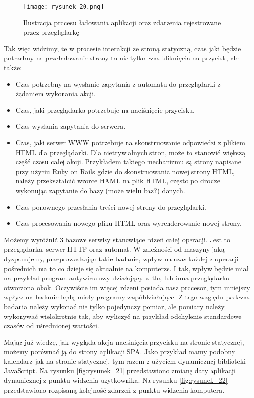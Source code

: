 \begin{figure}[!ht]
    \centering
    \texttt{[image: rysunek\_20.png]}
    \caption{Ilustracja procesu ładowania aplikacji oraz zdarzenia rejestrowane przez przeglądarkę}
    \label{fig:rysunek_20}
\end{figure}

Tak więc widzimy, że w procesie interakcji ze stroną statyczną, czas jaki będzie potrzebny na przeładowanie strony to nie tylko czas kliknięcia na przycisk, ale także:
\begin{itemize}
    \item Czas potrzebny na wysłanie zapytania z automatu do przeglądarki z żądaniem wykonania akcji.
    \item Czas, jaki przeglądarka potrzebuje na naciśnięcie przycisku.
    \item Czas wysłania zapytania do serwera.
    \item Czas, jaki serwer WWW potrzebuje na skonstruowanie odpowiedzi z plikiem HTML dla przeglądarki. Dla nietrywialnych stron, może to stanowić większą część czasu całej akcji.
    Przykładem takiego mechanizmu są strony napisane przy użyciu Ruby on Rails gdzie do skonstruowania nowej strony HTML,
    należy przekształcić wzorce HAML \cite{ruby} na plik HTML, często po drodze wykonując zapytanie do bazy (może wielu baz?) danych.
    \item Czas ponownego przesłania treści nowej strony do przeglądarki.
    \item Czas procesowania nowego pliku HTML oraz wyrenderowanie nowej strony.    
\end{itemize}

Możemy wyróżnić 3 bazowe serwisy stanowiące rdzeń całej operacji.
Jest to przeglądarka, serwer HTTP oraz automat.
W zależności od maszyny jaką dysponujemy, przeprowadzając takie badanie, wpływ na czas każdej z operacji pośrednich ma to co dzieje się aktualnie na komputerze.
I tak, wpływ będzie miał na przykład program antywirusowy działający w tle, lub inna przeglądarka otworzona obok.
Oczywiście im więcej rdzeni \cite{threads} posiada nasz procesor, tym mniejszy wpływ na badanie będą miały programy współdziałające.
Z tego względu podczas badania należy wykonać nie tylko pojedynczy pomiar, ale pomiary należy wykonywać wielokrotnie tak, aby wyliczyć na przykład
odchylenie standardowe czasów od uśrednionej wartości.

Mając już wiedzę, jak wygląda akcja naciśnięcia przycisku na stronie statycznej, możemy porównać ją do strony aplikacji SPA.
Jako przykład mamy podobny kalendarz jak na stronie statycznej, tym razem z użyciem dynamicznej biblioteki JavaScript.
Na rysunku \ref{fig:rysunek_21} przedstawiono zmianę daty aplikacji dynamicznej z punktu widzenia użytkownika.
Na rysunku \ref{fig:rysunek_22} przedstawiono rozpisaną kolejność zdarzeń z punktu widzenia komputera.

